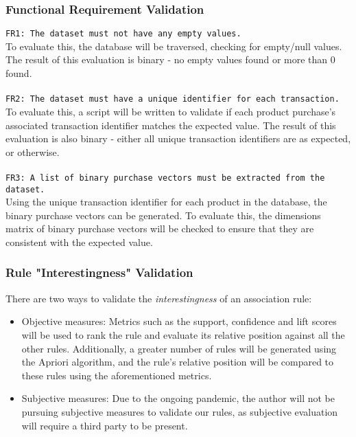 \documentclass[a4paper,11pt]{article}
\begin{document}
\subsubsection*{Functional Requirement Validation}
\texttt{FR1: The dataset must not have any empty values.}\\
To evaluate this,  the database will be traversed, checking for empty/null values. The result of this evaluation is binary - no empty values found or more than 0 found.\\\\
\texttt{FR2: The dataset must have a unique identifier for each transaction.}\\
To evaluate this, a script will be written to validate if each product purchase's associated transaction identifier matches the expected value. The result of this evaluation is also binary - either all unique transaction identifiers are as expected, or otherwise.\\\\
\texttt{FR3: A list of binary purchase vectors must be extracted from the dataset.}\\
Using the unique transaction identifier for each product in the database, the binary purchase vectors can be generated.  To evaluate this,  the dimensions matrix of binary purchase vectors will be checked to ensure that they are consistent with the expected value.

\subsubsection*{Rule "Interestingness" Validation}
There are two ways to validate the \textit{interestingness} of an association rule:
\begin{itemize}
\item Objective measures: Metrics such as the support, confidence and lift scores will be used to rank the rule and evaluate its relative position against all the other rules.  Additionally, a greater number of rules will be generated using the Apriori algorithm,  and the rule's relative position will be compared to these rules using the aforementioned metrics.
\item Subjective measures: Due to the ongoing pandemic, the author will not be pursuing subjective measures to validate our rules, as subjective evaluation will require a third party to be present.
\end{itemize}
\end{document}

